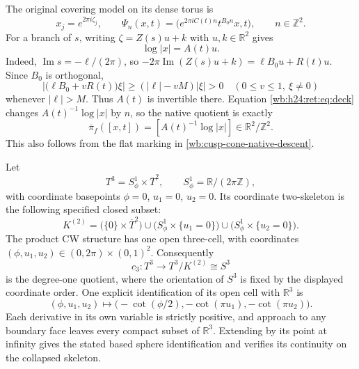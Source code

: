 The original covering model on its dense torus is
\begin{equation}
 x_j=e^{2\pi i\zeta_j},\qquad
 \Psi_n(x,t)=
 \bigl(e^{2\pi i C(t)n}t^{B_0n}x,t\bigr),\qquad n\in\mathbb Z^2.
 \label{wb:h24:ret:eq:deck}
\end{equation}
For a branch of \(s\), writing
\(\zeta=Z(s)u+k\) with \(u,k\in\mathbb R^2\) gives
\begin{equation}
 \log|x|=A(t)u.
 \label{wb:h24:ret:eq:logx}
\end{equation}
Indeed, \(\operatorname{Im}s=-\ell/(2\pi)\), so
\(-2\pi\operatorname{Im}(Z(s)u+k)=\ell B_0u+R(t)u\).
Since \(B_0\) is orthogonal,
\begin{equation}
 \bigl|\bigl(\ell B_0+vR(t)\bigr)\xi\bigr|
 \geq (|\ell|-vM)|\xi|>0
 \quad(0\leq v\leq1,\ \xi\ne0)
 \label{wb:h24:ret:eq:invertibility}
\end{equation}
whenever \(|\ell|>M\).  Thus \(A(t)\) is invertible there.  Equation
\eqref{wb:h24:ret:eq:deck} changes \(A(t)^{-1}\log|x|\) by \(n\), so the native
quotient is exactly
\begin{equation}
 \overline\pi_f([x,t])=[A(t)^{-1}\log|x|]\in\mathbb R^2/\mathbb Z^2.
 \label{wb:h24:ret:eq:native}
\end{equation}
This also follows from the flat marking in \cref{wb:cusp-cone-native-descent}.

Let
\[
 T^3=S^1_\phi\times\overline T^2,
 \qquad S^1_\phi=\mathbb R/(2\pi\mathbb Z),
\]
with coordinate basepoints \(\phi=0\), \(u_1=0\), \(u_2=0\).
Its coordinate two-skeleton is the following specified closed subset:
\begin{equation}
 K^{(2)}=
 \bigl(\{0\}\times\overline T^2\bigr)
 \cup\bigl(S^1_\phi\times\{u_1=0\}\bigr)
 \cup\bigl(S^1_\phi\times\{u_2=0\}\bigr).
 \label{wb:h24:ret:eq:two-skeleton}
\end{equation}
The product CW structure has one open three-cell, with coordinates
\((\phi,u_1,u_2)\in(0,2\pi)\times(0,1)^2\).  Consequently
\[
 c_3:T^3\longrightarrow T^3/K^{(2)}\cong S^3
\]
is the degree-one quotient, where the orientation of \(S^3\) is fixed
by the displayed coordinate order.  One explicit identification of its
open cell with \(\mathbb R^3\) is
\[
 (\phi,u_1,u_2)\longmapsto
 \bigl(-\cot(\phi/2),-\cot(\pi u_1),-\cot(\pi u_2)\bigr).
\]
Each derivative in its own variable is strictly positive, and approach
to any boundary face leaves every compact subset of \(\mathbb R^3\).
Extending by its point at infinity gives the stated based sphere
identification and verifies its continuity on the collapsed skeleton.


